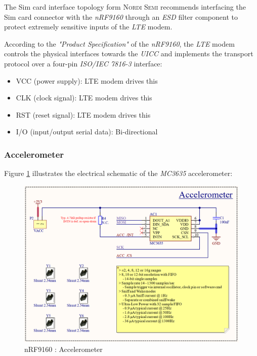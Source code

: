 \documentclass[report.tex]{subfiles}
\begin{document}
The Sim card interface topology form \textsc{Nordi Semi} recommends interfacing the Sim card connector with the \textit{nRF9160} through an \textit{ESD} filter component to protect extremely sensitive inputs of the \textit{LTE} modem.

\pagebreak

According to the \textit{"Product Specification"}\cite{nRF9160} of the \textit{nRF9160}, the \textit{LTE} modem controls the physical interfaces towards the \textit{UICC} and implements the transport protocol over a four-pin \textit{ISO/IEC 7816-3} interface:
\begin{itemize}
\item VCC (power supply): LTE modem drives this
\item CLK (clock signal): LTE modem drives this
\item RST (reset signal): LTE modem drives this
\item I/O (input/output serial data): Bi-directional
\end{itemize}

\subsubsection{Accelerometer}

Figure \ref{fig:LTEWatch_nRF9160_Accelerometer} illustrates the electrical schematic of the \textit{MC3635} accelerometer:

\begin{figure}[H]
	\centering
	\includegraphics[width=1\textwidth]{Include/Figure/Hardware/LTEWatch_nRF9160_Accelerometer}
	\caption{nRF9160 : Accelerometer}
	\label{fig:LTEWatch_nRF9160_Accelerometer}
\end{figure}
\end{document}
